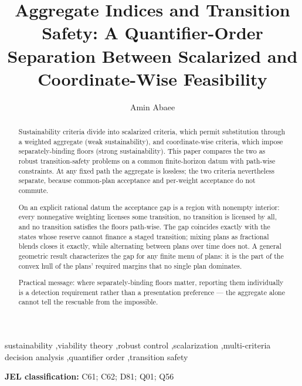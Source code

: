 \documentclass[review,11pt]{elsarticle}
\providecommand{\jel}[1]{\par\noindent\textbf{JEL classification:} #1\par}
\begin{document}
\begin{frontmatter}

\title{Aggregate Indices and Transition Safety: A Quantifier-Order Separation Between Scalarized and Coordinate-Wise Feasibility}

\author[aff]{Amin Abaee}

\address[aff]{Independent Researcher, \href{https://orcid.org/0000-0002-0019-1842}{ORCID: 0000-0002-0019-1842}, \href{mailto:amin\_abaee@ut.ac.ir}{amin\_abaee@ut.ac.ir}}

\begin{abstract}

Sustainability criteria divide into scalarized criteria, which permit
substitution through a weighted aggregate (weak sustainability), and
coordinate-wise criteria, which impose separately-binding floors (strong
sustainability). This paper compares the two as
robust transition-safety problems on a common finite-horizon datum with
path-wise constraints. At any fixed path the aggregate is lossless; the
two criteria nevertheless separate, because common-plan acceptance and
per-weight acceptance do not commute.

On an explicit rational datum the acceptance gap is a region with
nonempty interior: every nonnegative weighting licenses some transition,
no transition is licensed by all, and no transition satisfies the floors
path-wise. The gap coincides exactly with the states whose reserve
cannot finance a staged transition; mixing plans as fractional blends
closes it exactly, while alternating between plans over time does not.
A general geometric result characterizes the gap for any finite menu of
plans: it is the part of the convex hull of the plans' required margins
that no single plan dominates.

Practical message: where separately-binding floors matter, reporting
them individually is a detection requirement rather than a presentation
preference --- the aggregate alone cannot tell the rescuable from the
impossible.

\end{abstract}

\begin{keyword}
sustainability \sep viability theory \sep robust control \sep scalarization \sep multi-criteria decision analysis \sep quantifier order \sep transition safety
\end{keyword}

\jel{C61; C62; D81; Q01; Q56}


\end{frontmatter}
\end{document}

